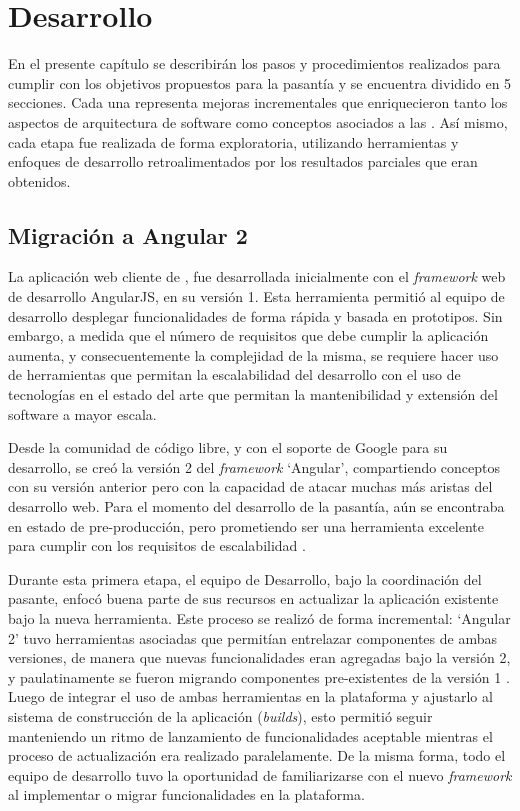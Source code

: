 \chapter{Desarrollo}

En el presente capítulo se describirán los pasos y procedimientos realizados para cumplir con los objetivos propuestos para la pasantía y se encuentra dividido en 5 secciones. Cada una representa mejoras incrementales que enriquecieron tanto los aspectos de arquitectura de software como conceptos asociados a las \pwas. Así mismo, cada etapa fue realizada de forma exploratoria, utilizando herramientas y enfoques de desarrollo retroalimentados por los resultados parciales que eran obtenidos.

\section{Migración a Angular 2}

La aplicación web cliente de \business, fue desarrollada inicialmente con el \textit{framework} web de desarrollo AngularJS, en su versión 1. Esta herramienta permitió al equipo de desarrollo desplegar funcionalidades de forma rápida y basada en prototipos. Sin embargo, a medida que el número de requisitos que debe cumplir la aplicación aumenta, y consecuentemente la complejidad de la misma, se requiere hacer uso de herramientas que permitan la escalabilidad del desarrollo con el uso de tecnologías en el estado del arte que permitan la mantenibilidad y extensión del software a mayor escala.

Desde la comunidad de código libre, y con el soporte de Google para su desarrollo, se creó la versión 2 del \textit{framework} `Angular', compartiendo conceptos con su versión anterior pero con la capacidad de atacar muchas más aristas del desarrollo web. Para el momento del desarrollo de la pasantía, aún se encontraba en estado de pre-producción, pero prometiendo ser una herramienta excelente para cumplir con los requisitos de escalabilidad \cite{angularchangelog}.

Durante esta primera etapa, el equipo de Desarrollo, bajo la coordinación del pasante, enfocó buena parte de sus recursos en actualizar la aplicación existente bajo la nueva herramienta. Este proceso se realizó de forma incremental: `Angular 2' tuvo herramientas asociadas que permitían entrelazar componentes de ambas versiones, de manera que nuevas funcionalidades eran agregadas bajo la versión 2, y paulatinamente se fueron migrando componentes pre-existentes de la versión 1 \cite{angularupgrade}. Luego de integrar el uso de ambas herramientas en la plataforma y ajustarlo al sistema de construcción de la aplicación (\textit{builds}), esto permitió seguir manteniendo un ritmo de lanzamiento de funcionalidades aceptable mientras el proceso de actualización era realizado paralelamente. De la misma forma, todo el equipo de desarrollo tuvo la oportunidad de familiarizarse con el nuevo \textit{framework} al implementar o migrar funcionalidades en la plataforma.

